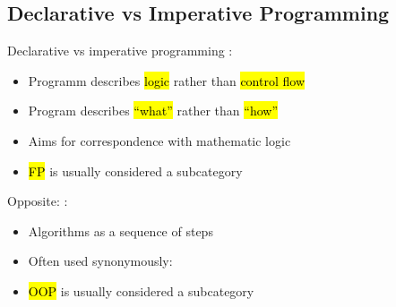 \subsection[Declarative vs Imperative]{Declarative vs Imperative Programming}


\begin{frame}{Declarative vs imperative programming}
	:
	\begin{itemize}
		\item Programm describes \hl{logic} rather than \hl{control flow}
		\item Program describes \hl{\enquote{what}} rather than \hl{\enquote{how}}
		\item Aims for correspondence with mathematic logic
		\item \hl{FP} is usually considered a subcategory
	\end{itemize}
	
	\medskip
	Opposite: :
	\begin{itemize}
		\item Algorithms as a sequence of steps
		\item Often used synonymously:  
		\item \hl{OOP} is usually considered a subcategory
	\end{itemize}
\end{frame}

